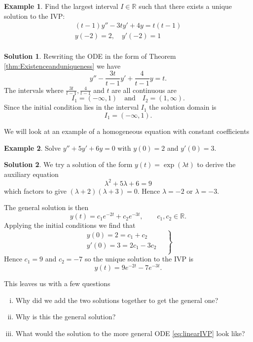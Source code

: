 \documentclass{article}
\theoremstyle{plain}
\theoremstyle{definition}
\newtheorem{exmp}{Example}[section]
\newtheorem*{sol}{Solution}
\numberwithin{equation}{section}
\begin{document}
\begin{tcolorbox}
\begin{exmp}
Find the largest interval $I \in \mathbb{R}$ such that there exists a unique solution to the IVP:
\[
\begin{aligned}
    (t-1)y'' - 3ty' + 4y = t(t-1) \\
    y(-2) = 2, \quad y'(-2) = 1 \\
\end{aligned}
\]
\end{exmp}
\begin{sol}
    Rewriting the ODE in the form of Theorem \ref{thm:Existenceanduniqueness} we have
    \[
    y'' - \frac{3t}{t-1}y' + \frac{4}{t-1}y = t.
    \]
    The intervals where $\frac{3t}{t-1}, \frac{4}{t-1}$ and $t$ are all continuous are
    \[
        I_1 = (-\infty, 1) \quad \text{and} \quad I_2 = (1, \infty).
    \]
    Since the initial condition lies in the interval $I_1$ the solution domain is
    \[
        I_1 = (-\infty, 1).
    \]
\end{sol}
\end{tcolorbox}

We will look at an example of a homogeneous equation with constant coefficients

\begin{tcolorbox}
\begin{exmp}
    Solve $y''+5y' + 6y = 0$ with $y(0)=2$ and $y'(0)=3$.
\end{exmp}
\begin{sol}
    We try a solution of the form $y(t)=\exp(\lambda t)$ to derive the auxiliary equation
    \[
    \lambda^2 + 5\lambda + 6 =9
    \]
    which factors to give $(\lambda + 2)(\lambda + 3) = 0$. Hence $\lambda = -2$ or $\lambda = -3$.

    The general solution is then
    \[
        y(t) = c_1 e^{-2t} + c_2 e^{-3t},  
    \qquad c_1,c_2 \in \mathbb{R}.
    \]
    Applying the initial conditions we find that
    \[
    \left.
    \begin{aligned}
        y(0) = 2 = c_1 + c_2 \\
        y'(0) = 3 = 2c_1 - 3c_2 \\
    \end{aligned}
    \quad\right\rbrace
    \]
    Hence $c_1 = 9$ and $c_2 = -7$ so the unique solution to the IVP is
    \[
        y(t) = 9e^{-2t} - 7e^{-3t}.
    \]
\end{sol}
\end{tcolorbox}

This leaves us with a few questions
\begin{enumerate}[(i)]
    \item Why did we add the two solutions together to get the general one?
    \item Why is this the general solution?
    \item What would the solution to the more general ODE \eqref{eq:linearIVP} look like?
\end{enumerate}
\end{document}
